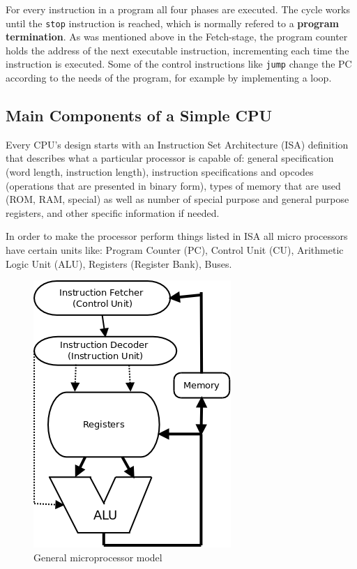 \documentclass[12pt,a4paper]{scrartcl}
\begin{document}
For every instruction in a program all four phases are executed. The cycle works until the \texttt{stop} instruction is reached, which is normally refered to a \textbf{program termination}. As was mentioned above in the Fetch-stage, the program counter holds the address of the next executable instruction, incrementing each time the instruction is executed. Some of the control instructions like \texttt{jump} change the PC according to the needs of the program, for example by implementing a loop.

\subsection{Main Components of a Simple CPU}
Every CPU's design starts with an Instruction Set Architecture (ISA) definition that describes what a particular processor is capable of: general specification (word length, instruction length), instruction specifications and opcodes (operations that are presented in binary form), types of memory that are used (ROM, RAM, special) as well as number of special purpose and general purpose registers, and other specific information if needed.

In order to make the processor perform things listed in ISA all micro processors have certain units like: Program Counter (PC), Control Unit (CU), Arithmetic Logic Unit (ALU), Registers (Register Bank), Buses.\\

\begin{figure}[h]
	\centering
	\includegraphics[scale=0.6]{pics/simpleCPU3.png}
	\caption{General microprocessor model}
\end{figure}
\end{document}
